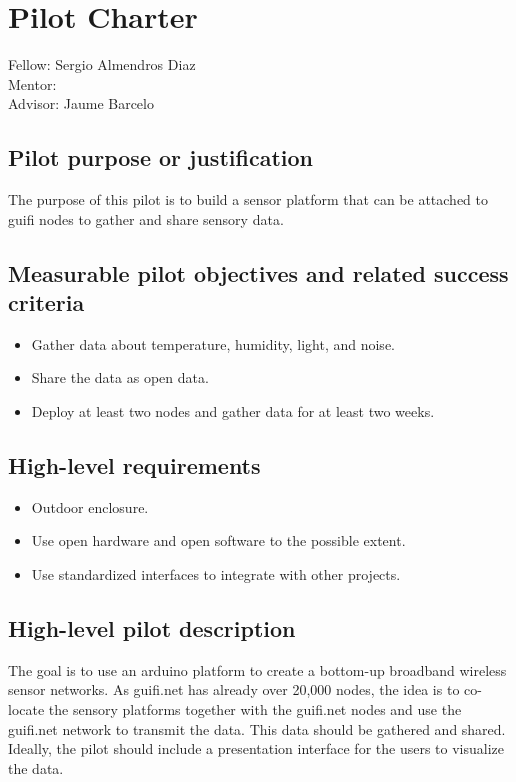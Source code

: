 \section{Pilot Charter}
\label{sec:mnp}

Fellow: Sergio Almendros Diaz
\\
Mentor: 
\\
Advisor: Jaume Barcelo

\subsection{Pilot purpose or justification}
The purpose of this pilot is to build a sensor platform that can be attached to guifi nodes to gather and share sensory data.

\subsection{Measurable pilot objectives and related success criteria}
\begin{itemize}
\item Gather data about temperature, humidity, light, and noise. 
\item Share the data as open data.
\item Deploy at least two nodes and gather data for at least two weeks.
\end{itemize}

\subsection{High-level requirements}
\begin{itemize}
\item Outdoor enclosure.
\item Use open hardware and open software to the possible extent.
\item Use standardized interfaces to integrate with other projects.
\end{itemize}

\subsection{High-level pilot description}
The goal is to use an arduino platform to create a bottom-up broadband wireless sensor networks. 
As guifi.net has already over 20,000 nodes, the idea is to co-locate the sensory platforms together with the guifi.net nodes and use the guifi.net network to transmit the data.
This data should be gathered and shared.
Ideally, the pilot should include a presentation interface for the users to visualize the data.

